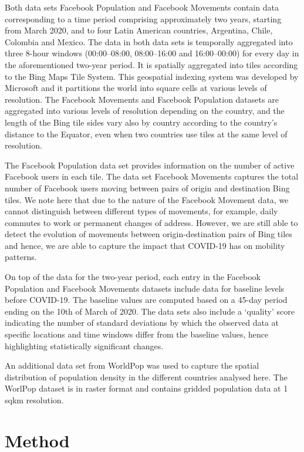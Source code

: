 \documentclass[11pt,letterpaper]{article}
\begin{document}
Both data sets Facebook Population and Facebook Movements contain data
corresponding to a time period comprising approximately two years,
starting from March 2020, and to four Latin American countries,
Argentina, Chile, Colombia and Mexico. The data in both data sets is
temporally aggregated into three 8-hour windows (00:00--08:00,
08:00--16:00 and 16:00--00:00) for every day in the aforementioned
two-year period. It is spatially aggregated into tiles according to the
Bing Maps Tile System. This geospatial indexing system was developed by
Microsoft and it partitions the world into square cells at various
levels of resolution. The Facebook Movements and Facebook Population
datasets are aggregated into various levels of resolution depending on
the country, and the length of the Bing tile sides vary also by country
according to the country's distance to the Equator, even when two
countries use tiles at the same level of resolution.

The Facebook Population data set provides information on the number of
active Facebook users in each tile. The data set Facebook Movements
captures the total number of Facebook users moving between pairs of
origin and destination Bing tiles. We note here that due to the nature
of the Facebook Movement data, we cannot distinguish between different
types of movements, for example, daily commutes to work or permanent
changes of address. However, we are still able to detect the evolution
of movements between origin-destination pairs of Bing tiles and hence,
we are able to capture the impact that COVID-19 has on mobility
patterns.

On top of the data for the two-year period, each entry in the Facebook
Population and Facebook Movements datasets include data for baseline
levels before COVID-19. The baseline values are computed based on a
45-day period ending on the 10th of March of 2020. The data sets also
include a `quality' score indicating the number of standard deviations
by which the observed data at specific locations and time windows differ
from the baseline values, hence highlighting statistically significant
changes.

An additional data set from WorldPop was used to capture the spatial
distribution of population density in the different countries analysed
here. The WorlPop dataset is in raster format and contains gridded
population data at 1 sqkm resolution.

\section{Method}
\end{document}
